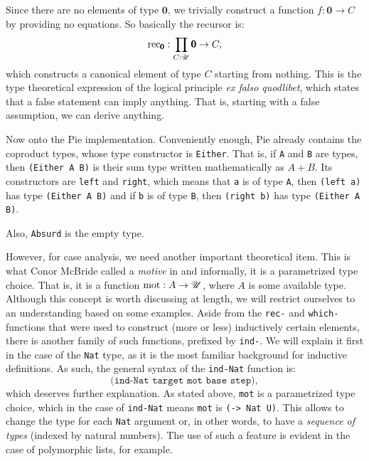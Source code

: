 Since there are no elements of type $ \pmb{0} $, we trivially construct
a function $ f : \pmb{0} \to C $ by providing no equations. So basically
the recursor is:
\[
  \mathrm{rec}_{\pmb{0}} : \prod_{C : \mathscr{U}} \pmb{0} \to C,
\]
which constructs a canonical element of type $ C $ starting from nothing.
This is the type theoretical expression of the logical principle
\emph{ex falso quodlibet}, which states that a false statement can imply
anything. That is, starting with a false assumption, we can derive anything.

\vspace{0.3cm}

Now onto the Pie implementation. Conveniently enough, Pie already contains
the coproduct types, whose type constructor is \texttt{Either}. That is,
if \texttt{A} and \texttt{B} are types, then \texttt{(Either A B)} is their
sum type written mathematically as $ A + B $. Its constructors are
\texttt{left} and \texttt{right}, which means that \texttt{a} is of type
\texttt{A}, then \texttt{(left a)} has type \texttt{(Either A B)}
and if \texttt{b} is of type \texttt{B}, then \texttt{(right b)} has
type \texttt{(Either A B)}.

Also, \texttt{Absurd} is the empty type.

However, for case analysis, we need another important theoretical item.
This is what Conor McBride called a \emph{motive} in \cite{motive} and
informally, it is a parametrized type choice. That is, it is a function
$ \mathrm{mot} : A \to \mathscr{U} $, where $ A $ is some available type. Although
this concept is worth discussing at length, we will restrict ourselves to
an understanding based on some examples. Aside from the \texttt{rec-} and
\texttt{which-} functions that were used to construct (more or less)
inductively certain elements, there is another family of such functions,
prefixed by \texttt{ind-}. We will explain it first in the case of the
\texttt{Nat} type, as it is the most familiar background for inductive
definitions. As such, the general syntax of the \texttt{ind-Nat} function is:
\begin{equation}
  \label{eq:ind-nat}
  \texttt{(ind-Nat \ target \ mot \ base \ step)},
\end{equation}
which deserves further explanation. As stated above, \texttt{mot} is a
parametrized type choice, which in the case of \texttt{ind-Nat} means \texttt{mot}
is \texttt{(-> Nat U)}. This allows to change the type for each \texttt{Nat}
argument or, in other words, to have a \emph{sequence of types} (indexed
by natural numbers). The use of such a feature is evident in the case of
polymorphic lists, for example.

